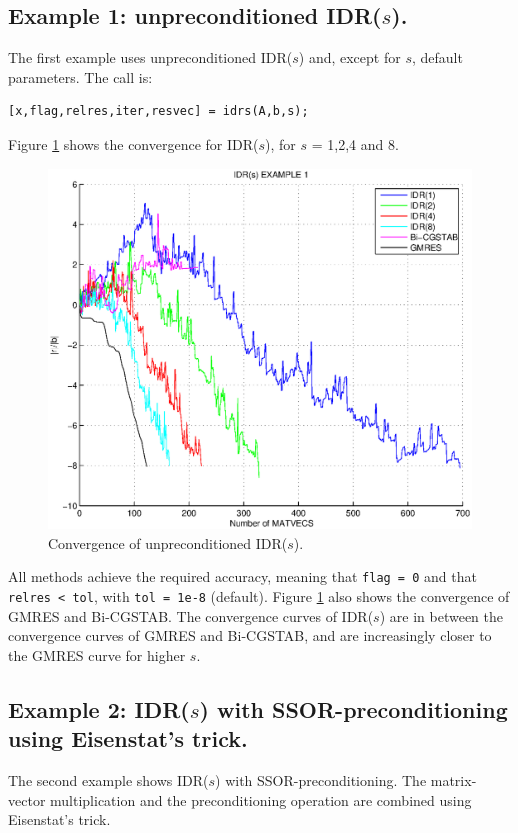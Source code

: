 \documentclass[prodmode,acmtoms]{acmsmall}
\begin{document}
\subsection{Example 1: unpreconditioned IDR($s$).}
The first example uses unpreconditioned  IDR($s$) and, except for $s$, default parameters. The call is:
\begin{verbatim}
[x,flag,relres,iter,resvec] = idrs(A,b,s);
\end{verbatim}
Figure \ref{fig:example1} shows the convergence for IDR($s$), for $s$ = 1,2,4 and 8.
\begin{figure}
\centering
\includegraphics[width=.60\linewidth]{example1}
\caption{Convergence of unpreconditioned IDR($s$).}
\label{fig:example1}
\end{figure}
All methods achieve the required accuracy, meaning that {\tt flag = 0} and that {\tt relres < tol}, with 
{\tt tol = 1e-8} (default). Figure \ref{fig:example1} also shows the convergence of GMRES and Bi-CGSTAB. The convergence
curves of IDR($s$) are in between the convergence curves of GMRES and Bi-CGSTAB, and are increasingly closer to
the GMRES curve for higher $s$.

\subsection{Example 2: IDR($s$) with SSOR-preconditioning  using Eisenstat's trick.}
The second example shows IDR($s$) with SSOR-preconditioning. The matrix-vector multiplication and 
the preconditioning operation are combined using Eisenstat's trick.
\end{document}

